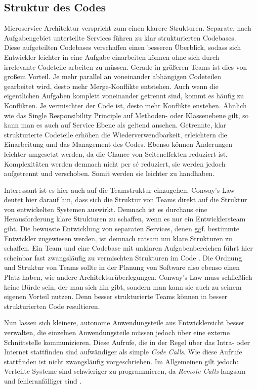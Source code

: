\subsection{Struktur des Codes}
Microservice Architektur verspricht zum einen klarere Strukturen. Separate, nach Aufgabengebiet unterteilte Services führen zu klar strukturierten Codebases. Diese aufgeteilten Codebases verschaffen einen besseren Überblick, sodass sich Entwickler leichter in eine Aufgabe einarbeiten können ohne sich durch irrelevante Codeteile arbeiten zu müssen. Gerade in größeren Teams ist dies von großem Vorteil. Je mehr parallel an voneinander abhängigen Codeteilen gearbeitet wird, desto mehr Merge-Konflikte entstehen. Auch wenn die eigentlichen Aufgaben komplett voneinander getrennt sind, kommt es häufig zu Konflikten. Je vermischter der Code ist, desto mehr Konflikte enstehen. Ähnlich wie das Single Responsibility Principle auf Methoden- oder Klassenebene gilt, so kann man es auch auf Service Ebene als geltend ansehen. Getrennte, klar strukturierte Codeteile erhöhen die Wiederverwendbarkeit, erleichtern die Einarbeitung und das Management des Codes. Ebenso können Änderungen leichter umgesetzt werden, da die Chance von Seiteneffekten reduziert ist. Komplexitäten werden demnach nicht per sé reduziert, sie werden jedoch aufgetrennt und verschoben. Somit werden sie leichter zu handhaben.

Interessant ist es hier auch auf die Teamstruktur einzugehen. Conway's Law \cite{conwayslaw} deutet hier darauf hin, dass sich die Struktur von Teams direkt auf die Struktur von entwickelten Systemen auswirkt. Demnach ist es durchaus eine Herausforderung klare Strukturen zu schaffen, wenn es nur ein Entwicklersteam gibt. Die bewusste Entwicklung von separaten Services, denen ggf. bestimmte Entwickler zugewiesen werden, ist demnach ratsam um klare Strukturen zu schaffen. Ein Team und eine Codebase mit unklaren Aufgabenbereichen führt hier scheinbar fast zwangsläufig zu vermischten Strukturen im Code \cite{conwayslaw}.
Die Ordnung und Struktur von Teams sollte in der Planung von Software also ebenso einen Platz haben, wie andere Architekturüberlegungen. Conway's Law muss schließlich keine Bürde sein, der man sich hin gibt, sondern man kann sie auch zu seinem eigenen Vorteil nutzen. Denn besser strukturierte Teams können in besser strukturierten Code resultieren.

Nun lassen sich kleinere, autonome Anwendungsteile aus Entwicklersicht besser verwalten, die einzelnen Anwendungsteile müssen jedoch über eine externe Schnittstelle kommunizieren. Diese Aufrufe, die in der Regel über das Intra- oder Internet stattfinden sind aufwändiger als simple \textit{Code Calls}. Wie diese Aufrufe stattfinden ist nicht zwangsläufig vorgeschrieben. Im Allgemeinen gilt jedoch: Verteilte Systeme sind schwieriger zu programmieren, da \textit{Remote Calls} langsam und fehleranfälliger sind \cite[vgl.][]{Fowler:Guide}.

